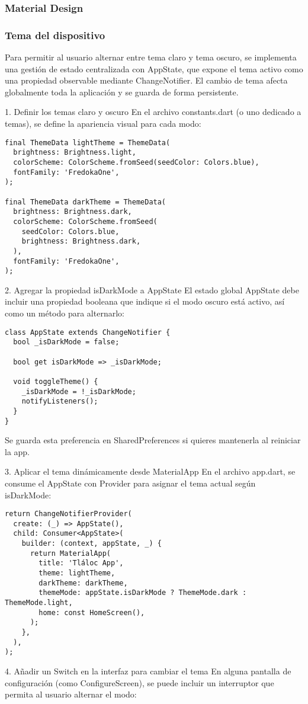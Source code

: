 \subsubsection{Material Design}


\subsubsection*{Tema del dispositivo}

Para permitir al usuario alternar entre tema claro y tema oscuro, se implementa una gestión de estado centralizada con AppState, que expone el tema activo como una propiedad observable mediante ChangeNotifier. El cambio de tema afecta globalmente toda la aplicación y se guarda de forma persistente.

1. Definir los temas claro y oscuro
En el archivo constants.dart (o uno dedicado a temas), se define la apariencia visual para cada modo:


\begin{verbatim}
final ThemeData lightTheme = ThemeData(
  brightness: Brightness.light,
  colorScheme: ColorScheme.fromSeed(seedColor: Colors.blue),
  fontFamily: 'FredokaOne',
);

final ThemeData darkTheme = ThemeData(
  brightness: Brightness.dark,
  colorScheme: ColorScheme.fromSeed(
    seedColor: Colors.blue,
    brightness: Brightness.dark,
  ),
  fontFamily: 'FredokaOne',
);
\end{verbatim}
2. Agregar la propiedad isDarkMode a AppState
El estado global AppState debe incluir una propiedad booleana que indique si el modo oscuro está activo, así como un método para alternarlo:

\begin{verbatim}
class AppState extends ChangeNotifier {
  bool _isDarkMode = false;

  bool get isDarkMode => _isDarkMode;

  void toggleTheme() {
    _isDarkMode = !_isDarkMode;
    notifyListeners();
  }
}
\end{verbatim}
Se guarda esta preferencia en SharedPreferences si quieres mantenerla al reiniciar la app.

3. Aplicar el tema dinámicamente desde MaterialApp
En el archivo app.dart, se consume el AppState con Provider para asignar el tema actual según isDarkMode:

\begin{verbatim}
return ChangeNotifierProvider(
  create: (_) => AppState(),
  child: Consumer<AppState>(
    builder: (context, appState, _) {
      return MaterialApp(
        title: 'Tláloc App',
        theme: lightTheme,
        darkTheme: darkTheme,
        themeMode: appState.isDarkMode ? ThemeMode.dark : ThemeMode.light,
        home: const HomeScreen(),
      );
    },
  ),
);
\end{verbatim}
4. Añadir un Switch en la interfaz para cambiar el tema
En alguna pantalla de configuración (como ConfigureScreen), se puede incluir un interruptor que permita al usuario alternar el modo:

